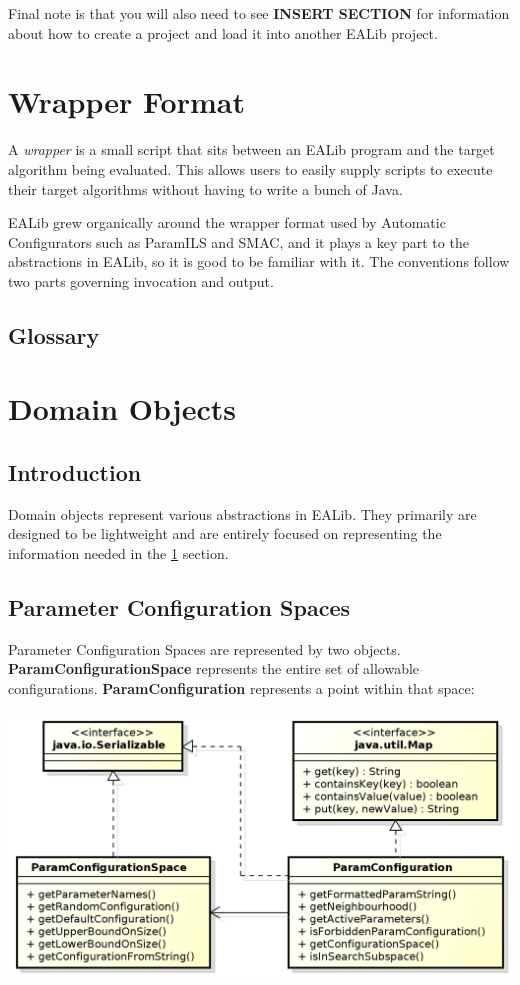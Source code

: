 \documentclass[11pt,letterpaper,oneside]{article}
\begin{document}
Final note is that you will also need to see {\Large \textbf{INSERT SECTION}} for information about how to create a project and load it into another EALib project.


\section{Wrapper Format}
\label{wrapper}
A \emph{wrapper} is a small script that sits between an EALib program and the target algorithm being evaluated. This allows users to easily supply scripts to execute their target algorithms without having to write a bunch of Java. 

EALib grew organically around the wrapper format used by Automatic Configurators such as ParamILS and SMAC, and it plays a key part to the abstractions in EALib, so it is good to be familiar with it. The conventions follow two parts governing invocation and output.




\subsection{Glossary}



\section{Domain Objects}

\subsection{Introduction}

Domain objects represent various abstractions in EALib. They primarily are designed to be lightweight and are entirely focused on representing the information needed in the \ref{wrapper} section.

\subsection{Parameter Configuration Spaces}

Parameter Configuration Spaces are represented by two objects. \textbf{ParamConfigurationSpace} represents the entire set of allowable configurations. \textbf{ParamConfiguration} represents a point within that space:

\begin{center}
\includegraphics[scale=0.75]{img/UML/ConfigurationSpace.png}
\end{center}
\end{document}
